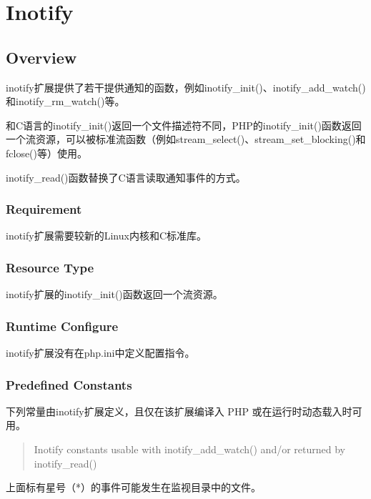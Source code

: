 \part{Inotify}

\chapter{Overview}


inotify扩展提供了若干提供通知的函数，例如inotify\_init()、inotify\_add\_watch()和inotify\_rm\_watch()等。

和C语言的inotify\_init()返回一个文件描述符不同，PHP的inotify\_init()函数返回一个流资源，可以被标准流函数（例如stream\_select()、stream\_set\_blocking()和fclose()等）使用。

inotify\_read()函数替换了C语言读取通知事件的方式。

\section{Requirement}


inotify扩展需要较新的Linux内核和C标准库。



\section{Resource Type}

inotify扩展的inotify\_init()函数返回一个流资源。

\section{Runtime Configure}

inotify扩展没有在php.ini中定义配置指令。

\section{Predefined Constants}

下列常量由inotify扩展定义，且仅在该扩展编译入 PHP 或在运行时动态载入时可用。

\begin{quote}
Inotify constants usable with inotify_add_watch() and/or returned by inotify_read()
\end{quote}





上面标有星号（*）的事件可能发生在监视目录中的文件。


